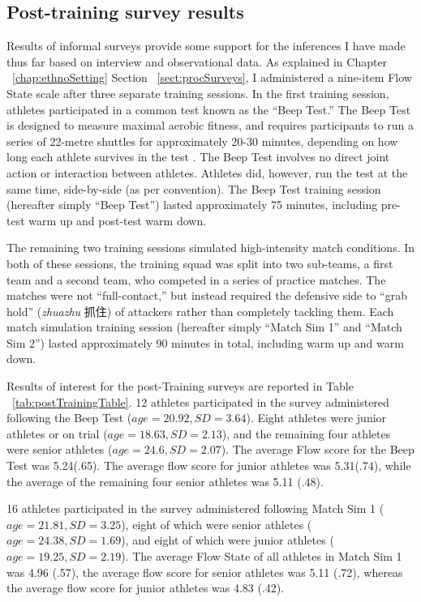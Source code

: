 \begin{CJK}{UTF8}{gbsn}
\subsection{Post-training survey results}
Results of informal surveys provide some support for the inferences I have made thus far based on interview and observational data. As explained in Chapter ~\ref{chap:ethnoSetting} Section ~\ref{sect:procSurveys}, I administered a nine-item Flow State scale after three separate training sessions.  In the first training session, athletes participated in a common test known as the ``Beep Test.''  The Beep Test is designed to measure maximal aerobic fitness, and requires participants to run a series of 22-metre shuttles for approximately 20-30 minutes, depending on how long each athlete survives in the test \citep[see][]{Stickland2003}.  The Beep Test involves no direct joint action or interaction between athletes.  Athletes did, however, run the test at the same time, side-by-side (as per convention).  The Beep Test training session (hereafter simply ``Beep Test'') lasted approximately 75 minutes, including pre-test warm up and post-test warm down.

The remaining two training sessions simulated high-intensity match conditions. In both of these sessions, the training squad was split into two sub-teams, a first team and a second team, who competed in a series of practice matches.  The matches were not ``full-contact,'' but instead required the defensive side to ``grab hold'' (\textit{zhuazhu} 抓住) of attackers rather than completely tackling them.  Each match simulation training session (hereafter simply ``Match Sim 1'' and ``Match Sim 2'') lasted approximately 90 minutes in total, including warm up and warm down.

  

Results of interest for the post-Training surveys are reported in Table ~\ref{tab:postTrainingTable}.  12 athletes participated in the survey administered following the Beep Test ($age = 20.92, SD = 3.64$). Eight athletes were junior athletes or on trial ($age = 18.63, SD = 2.13$), and the remaining four athletes were senior athletes ($age = 24.6, SD = 2.07$).  The average Flow score for the Beep Test was 5.24(.65).  The average flow score for junior athletes was 5.31(.74), while the average of the remaining four senior athletes was 5.11 (.48).

16 athletes participated in the survey administered following Match Sim 1 ($age = 21.81, SD = 3.25$), eight of which were senior athletes ($age = 24.38, SD =1.69$), and eight of which were junior athletes ($age = 19.25, SD = 2.19$). The average Flow State of all athletes in Match Sim 1 was 4.96 (.57), the average flow score for senior athletes was 5.11 (.72), whereas the average flow score for junior athletes was 4.83 (.42).


\end{CJK}
